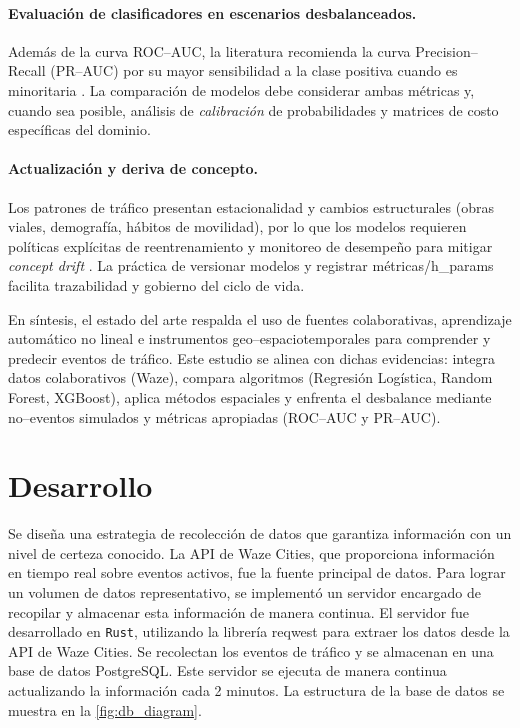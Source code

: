 \documentclass[12pt]{article}
\begin{document}
\paragraph{Evaluación de clasificadores en escenarios desbalanceados.}
Además de la curva ROC–AUC, la literatura recomienda la curva Precision–Recall (PR–AUC) por su mayor sensibilidad a la clase positiva cuando es minoritaria \parencite{saito2015}. La comparación de modelos debe considerar ambas métricas y, cuando sea posible, análisis de \textit{calibración} de probabilidades y matrices de costo específicas del dominio.

\paragraph{Actualización y deriva de concepto.}
Los patrones de tráfico presentan estacionalidad y cambios estructurales (obras viales, demografía, hábitos de movilidad), por lo que los modelos requieren políticas explícitas de reentrenamiento y monitoreo de desempeño para mitigar \textit{concept drift} \parencite{gama2014concept}. La práctica de versionar modelos y registrar métricas/h\_params facilita trazabilidad y gobierno del ciclo de vida.

En síntesis, el estado del arte respalda el uso de fuentes colaborativas, aprendizaje automático no lineal e instrumentos geo–espaciotemporales para comprender y predecir eventos de tráfico. Este estudio se alinea con dichas evidencias: integra datos colaborativos (Waze), compara algoritmos (Regresión Logística, Random Forest, XGBoost), aplica métodos espaciales y enfrenta el desbalance mediante no–eventos simulados y métricas apropiadas (ROC–AUC y PR–AUC).

\section{Desarrollo}

Se diseña una estrategia de recolección de datos que garantiza información con un nivel de certeza conocido. La API de Waze Cities, que proporciona información en tiempo real sobre eventos activos, fue la fuente principal de datos. Para lograr un volumen de datos representativo, se implementó un servidor encargado de recopilar y almacenar esta información de manera continua. El servidor fue desarrollado en \texttt{Rust}, utilizando la librería reqwest \parencite{reqwest2025} para extraer los datos desde la API de Waze Cities. Se recolectan los eventos de tráfico y se almacenan en una base de datos PostgreSQL. Este servidor se ejecuta de manera continua actualizando la información cada 2 minutos. La estructura de la base de datos se muestra en la \autoref{fig:db_diagram}.
\end{document}
